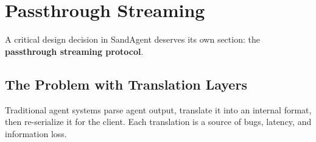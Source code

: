 \section{Passthrough Streaming}

A critical design decision in SandAgent deserves its own section: the \textbf{passthrough streaming protocol}.

\subsection{The Problem with Translation Layers}

Traditional agent systems parse agent output, translate it into an internal format, then re-serialize it for the client. Each translation is a source of bugs, latency, and information loss.

